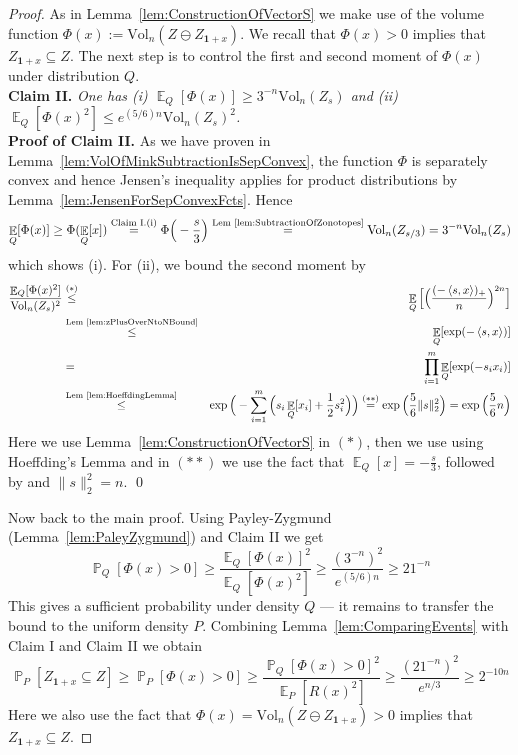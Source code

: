 \documentclass[12pt,english]{article}
\theoremstyle{theorem}
\theoremstyle{remark}
\newcommand{\E}{\mathop{\mathbb{E}}}
\newcommand{\Vol}{\mathrm{Vol}}
\renewcommand{\Pr}{\mathop{\mathbb{P}}}
\begin{document}
\begin{proof}
  As in Lemma~\ref{lem:ConstructionOfVectorS} we make use of the volume function $\Phi(x) := \Vol_n(Z \ominus Z_{\bm{1}+x})$.
  We recall that $\Phi(x) > 0$ implies that $Z_{\bm{1}+x} \subseteq Z$. The next step is to control the
  first and second moment of $\Phi(x)$ under distribution $Q$. \\
  {\bf Claim II.} \emph{One has (i) $\E_Q[\Phi(x)] \geq 3^{-n}\Vol_n(Z_s)$ and (ii) $\E_Q[\Phi(x)^2] \leq e^{(5/6)n}\Vol_n(Z_s)^2$.} \\
  {\bf Proof of Claim II.} As we have proven in Lemma~\ref{lem:VolOfMinkSubtractionIsSepConvex},
  the function $\Phi$ is separately convex and hence Jensen's inequality applies for product distributions by Lemma~\ref{lem:JensenForSepConvexFcts}. Hence
  \[
    \E_Q[\Phi(x)] \geq \Phi(\E_Q[x]) \stackrel{\textrm{Claim I.(i)}}{=} \Phi\Big(-\frac{s}{3}\Big)
    \stackrel{\textrm{Lem~\ref{lem:SubtractionOfZonotopes}}}{=} \Vol_n(Z_{s/3}) = 3^{-n} \Vol_n(Z_s)
  \]
  which shows (i). For (ii), we bound the second moment by 
  \begin{eqnarray*}
    \frac{\E_Q[\Phi(x)^2]}{\Vol_n(Z_s)^2} &\stackrel{(*)}{\leq}& \E_Q\Big[ \Big(\frac{(-\left<s,x\right>)_+}{n}\Big)^{2n}\Big] \\ &\stackrel{\textrm{Lem~\ref{lem:zPlusOverNtoNBound}}}{\leq}& \E_Q[\exp(-\left<s,x\right>)] \\ &=& \prod_{i=1}^m \E_Q[\exp(-s_ix_i)] \\ &\stackrel{\textrm{Lem~\ref{lem:HoeffdingLemma}}}{\leq}& \exp\Big(-\sum_{i=1}^m \Big( s_i\E_Q[x_i] + \frac{1}{2} s_i^2\Big)\Big) \stackrel{(**)}{=} \exp\Big(\frac{5}{6}\|s\|_2^2\Big) = \exp\Big(\frac{5}{6}n\Big)
  \end{eqnarray*}
  Here we use Lemma~\ref{lem:ConstructionOfVectorS} in $(*)$, then we use using Hoeffding's Lemma and in $(**)$ we use the fact that $\E_Q[x]=-\frac{s}{3}$, followed by and $\|s\|_2^2 = n$. \qed %

  Now back to the main proof. Using Payley-Zygmund (Lemma~\ref{lem:PaleyZygmund}) and Claim II we get
  \[
    \Pr_Q[\Phi(x) > 0] \geq \frac{\E_Q[\Phi(x)]^2}{\E_Q[\Phi(x)^2]} \geq \frac{(3^{-n})^2}{e^{(5/6)n}} \geq 21^{-n}
  \]
  This gives a sufficient probability under density $Q$ --- it remains to transfer the bound to the uniform density $P$. Combining Lemma~\ref{lem:ComparingEvents} with Claim I and Claim II we obtain
  \[
 \Pr_P[Z_{\bm{1}+x} \subseteq Z] \geq \Pr_P[\Phi(x)>0] \geq \frac{\Pr_Q[\Phi(x)>0]^2}{\E_P[R(x)^2]} \geq \frac{(21^{-n})^2}{e^{n/3}} \geq 2^{-10n}
  \]
  Here we also use the fact that $\Phi(x) = \Vol_n(Z \ominus Z_{\bm{1}+x})  > 0$ implies that $Z_{\bm{1}+x} \subseteq Z$.
\end{proof}
\end{document}
